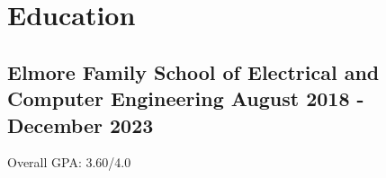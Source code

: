 \section{Education}
\subsection{{Elmore Family School of Electrical and Computer Engineering} \hfill August 2018 - December 2023}
\begin{zitemize}
\item Overall GPA: 3.60/4.0 
\end{zitemize}



